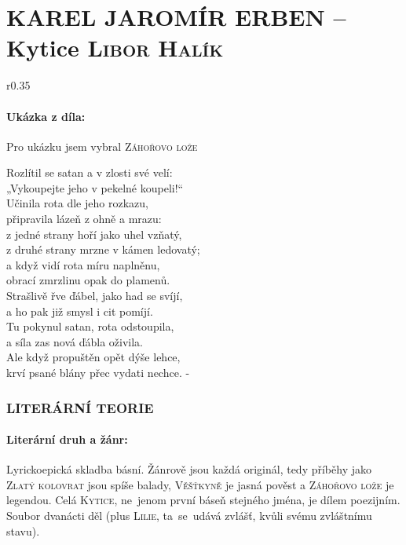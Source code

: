 \documentclass[A4paper]{extarticle} %
\begin{document}
\newpage


\changefontsize{7pt}

\part*{KAREL JAROMÍR ERBEN -- Kytice {\hfill \normalfont\tiny\textsc{Libor Halík}}}

\noindent\begin{wrapfigure}{r}{0.35\textwidth}
\tiny

\subsection*{Ukázka z díla:}
\setlength{\parindent}{3pt}
Pro ukázku jsem vybral \textsc{Záhořovo lože}
\begin{center}
\noindent
Rozlítil se satan a v zlosti své velí: \\
„Vykoupejte jeho v pekelné koupeli!“ \\
Učinila rota dle jeho rozkazu, \\
připravila lázeň z ohně a mrazu: \\
z jedné strany hoří jako uhel vzňatý, \\
z druhé strany mrzne v kámen ledovatý; \\
a když vidí rota míru naplněnu, \\
obrací zmrzlinu opak do plamenů. \\
Strašlivě řve ďábel, jako had se svíjí, \\
a ho pak již smysl i cit pomíjí. \\
Tu pokynul satan, rota odstoupila, \\
a síla zas nová ďábla oživila. \\
Ale když propuštěn opět dýše lehce, \\
krví psané blány přec vydati nechce. -
\end{center}
\vspace{3em}
\end{wrapfigure}

\section*{LITERÁRNÍ TEORIE}

\subsection*{Literární druh a žánr:}
\noindent 
Lyrickoepická skladba básní.
Žánrově jsou každá originál,
tedy příběhy jako \textsc{Zlatý kolovrat} jsou spíše balady,
\textsc{Věšťkyně} je jasná pověst
a \textsc{Záhořovo lože} je legendou.
Celá \textsc{Kytice}, ne~jenom první báseň stejného jména, je dílem poezijním.
Soubor dvanácti děl (plus \textsc{Lilie}, ta~se~udává zvlášť, kvůli svému zvláštnímu stavu).
\end{document}
